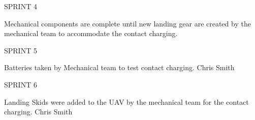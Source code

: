 \begin{description}
\item SPRINT 4

\item [1/18/16] Mechanical components are complete until new landing gear are created by the mechanical team to accommodate the contact charging.
\item SPRINT 5
\item [3/20/16] Batteries taken by Mechanical team to test contact charging. \hfill{Chris Smith}
\item SPRINT 6
\item [4/16/16] Landing Skids were added to the UAV by the mechanical team for the contact charging. \hfill{Chris Smith}

\end{description}